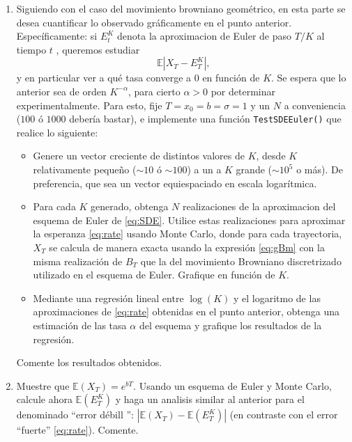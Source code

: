 \begin{enumerate}
\item Siguiendo con el caso del movimiento browniano geométrico, en esta parte se desea cuantificar lo observado gráficamente en el punto anterior. Específicamente: si $E_t^{K}$ denota la aproximacion de Euler de paso $T/K$ al tiempo $t$ , queremos estudiar
\begin{equation}
\label{eq:rate}
\mathbb{E} |X_T - E_T^K|,
\end{equation}
y en particular ver a qué tasa converge a 0 en función de $K$. Se espera que lo anterior sea de orden $K^{-\alpha}$, para cierto $\alpha >0$ por determinar experimentalmente. Para esto, fije $T=x_0=b=\sigma=1$ y un $N$ a conveniencia ($100$ ó $1000$ debería bastar), e implemente una función \texttt{TestSDEEuler()} que realice lo siguiente:
\begin{itemize}
\item Genere un vector creciente de distintos valores de $K$, desde $K$ relativamente pequeño ($\sim 10$ ó $\sim 100$) a un a $K$ grande ($\sim 10^5$ o m\'as). De preferencia, que sea un vector equiespaciado en escala logarítmica.
\item Para cada $K$ generado, obtenga $N$ realizaciones de la aproximacion del esquema de Euler de \eqref{eq:SDE}. Utilice estas realizaciones para aproximar la esperanza \eqref{eq:rate} usando Monte Carlo, donde para cada trayectoria,  $X_T$ se calcula de manera exacta usando la expresi\'on \eqref{eq:gBm} con la misma realizaci\'on de  $B_T$ que la del movimiento Browniano discretrizado utilizado en el esquema de Euler. Grafique en función de  $K$. 
\item Mediante una regresión lineal entre $\log(K)$ y el logaritmo de las aproximaciones de \eqref{eq:rate} obtenidas en el punto anterior, obtenga una estimación de las tasa $\alpha$ del esquema y grafique los resultados de la regresión.
\end{itemize}
Comente los resultados obtenidos.
\item Muestre que $\mathbb{E}(X_T)= e^{bT}$.  Usando un esquema de Euler y Monte Carlo, calcule ahora $\mathbb{E}(E_T^K)$ y haga un analisis similar al anterior para el denominado ``error d\'ebill '':   $| \mathbb{E}(X_T) - \mathbb{E}(E_T^K)|$   (en contraste con el error ``fuerte''   \eqref{eq:rate}).  Comente. 
\end{enumerate}



